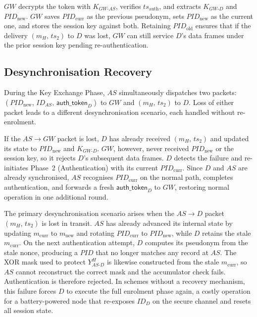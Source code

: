 \documentclass[conference]{IEEEtran}
\begin{document}
$GW$ decrypts the token with $K_{GW\text{-}AS}$, verifies $ts_{\mathrm{auth}}$,
and extracts $K_{GW\text{-}D}$ and $\mathit{PID}_{\mathrm{new}}$.  $GW$ saves
$\mathit{PID}_{\mathrm{curr}}$ as the previous pseudonym, sets
$\mathit{PID}_{\mathrm{new}}$ as the current one, and stores the session key
against both.  Retaining $\mathit{PID}_{\mathrm{old}}$ ensures that if the
delivery $(m_H,\, ts_2)$ to $D$ was lost, $GW$ can still service $D$'s data
frames under the prior session key pending re-authentication.

\subsection{Desynchronisation Recovery}

During the Key Exchange Phase, $AS$ simultaneously dispatches two packets:
$(\mathit{PID}_{\mathrm{new}},\, ID_{AS},\, \mathsf{auth\_token}_D)$ to $GW$
and $(m_H,\, ts_2)$ to $D$.
Loss of either packet leads to a different desynchronisation scenario, each
handled without re-enrolment.

If the $AS \to GW$ packet is lost, $D$ has already received $(m_H,\, ts_2)$
and updated its state to $\mathit{PID}_{\mathrm{new}}$ and $K_{GW\text{-}D}$.
$GW$, however, never received $\mathit{PID}_{\mathrm{new}}$ or the session key,
so it rejects $D$'s subsequent data frames.
$D$ detects the failure and re-initiates Phase~2 (Authentication) with its
current $\mathit{PID}_{\mathrm{curr}}$.
Since $D$ and $AS$ are already synchronised, $AS$ recognises $\mathit{PID}_{\mathrm{curr}}$
on the normal path, completes authentication, and forwards a fresh
$\mathsf{auth\_token}_D$ to $GW$, restoring normal operation in one additional round.

The primary desynchronisation scenario arises when the $AS \to D$ packet
$(m_H,\, ts_2)$ is lost in transit.  $AS$ has already advanced its internal
state by updating $m_{\mathrm{curr}}$ to $m_{\mathrm{new}}$ and rotating
$\mathit{PID}_{\mathrm{curr}}$ to $\mathit{PID}_{\mathrm{new}}$, while $D$
retains the stale $m_{\mathrm{curr}}$.  On the next authentication attempt,
$D$ computes its pseudonym from the stale nonce, producing a $\mathit{PID}$
that no longer matches any record at $AS$.  The XOR mask used to protect
$Y_{AS\text{-}D}^H$ is likewise constructed from the stale $m_{\mathrm{curr}}$,
so $AS$ cannot reconstruct the correct mask and the accumulator check fails.
Authentication is therefore rejected.  In schemes without a recovery mechanism,
this failure forces $D$ to execute the full enrolment phase again, a costly
operation for a battery-powered node that re-exposes $ID_D$ on the secure
channel and resets all session state.
\end{document}
